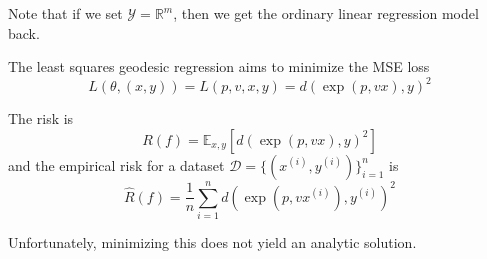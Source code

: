  Note that if we set $\mathcal{Y} = \mathbb{R}^m$, then we get the ordinary linear regression model back. 

  \begin{definition}
    The least squares geodesic regression aims to minimize the MSE loss 
    \begin{equation}
      L(\theta, (x, y)) = L(p, v, x, y) = d(\exp(p, vx), y)^2
    \end{equation}
  \end{definition}

  \begin{lemma}[Risk]
    The risk is 
    \begin{equation}
      R(f) = \mathbb{E}_{x, y} \left[ d(\exp(p, vx), y)^2 \right]
    \end{equation} 
    and the empirical risk for a dataset $\mathcal{D} = \{(x^{(i)}, y^{(i)})\}_{i=1}^n$ is 
    \begin{equation}
      \hat{R}(f) = \frac{1}{n} \sum_{i=1}^n d(\exp(p, v x^{(i)}), y^{(i)})^2
    \end{equation}
  \end{lemma}

  Unfortunately, minimizing this does not yield an analytic solution. 

